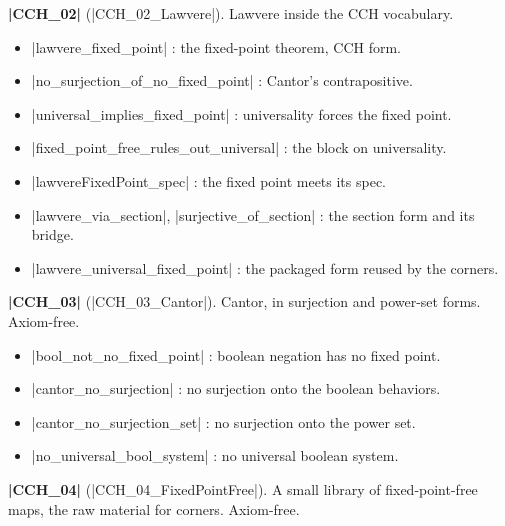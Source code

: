 \documentclass{memoir}
\begin{document}
\textbf{\LeanVerb|CCH_02|} (\LeanVerb|CCH_02_Lawvere|). Lawvere inside the CCH vocabulary.

\begin{itemize}
\item \LeanVerb|lawvere_fixed_point| : the fixed-point theorem, CCH form.
\item \LeanVerb|no_surjection_of_no_fixed_point| : Cantor's contrapositive.
\item \LeanVerb|universal_implies_fixed_point| : universality forces the fixed point.
\item \LeanVerb|fixed_point_free_rules_out_universal| : the block on universality.
\item \LeanVerb|lawvereFixedPoint_spec| : the fixed point meets its spec.
\item \LeanVerb|lawvere_via_section|, \LeanVerb|surjective_of_section| : the section form and its bridge.
\item \LeanVerb|lawvere_universal_fixed_point| : the packaged form reused by the corners.

\end{itemize}


\textbf{\LeanVerb|CCH_03|} (\LeanVerb|CCH_03_Cantor|). Cantor, in surjection and power-set forms. Axiom-free.

\begin{itemize}
\item \LeanVerb|bool_not_no_fixed_point| : boolean negation has no fixed point.
\item \LeanVerb|cantor_no_surjection| : no surjection onto the boolean behaviors.
\item \LeanVerb|cantor_no_surjection_set| : no surjection onto the power set.
\item \LeanVerb|no_universal_bool_system| : no universal boolean system.

\end{itemize}


\textbf{\LeanVerb|CCH_04|} (\LeanVerb|CCH_04_FixedPointFree|). A small library of fixed-point-free maps, the
raw material for corners. Axiom-free.
\end{document}
